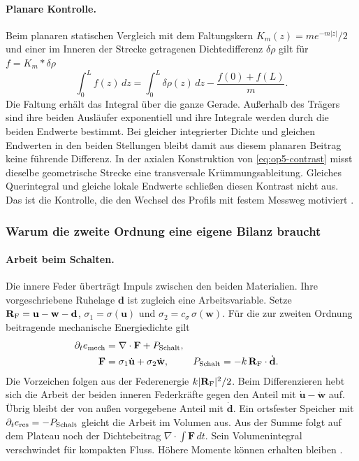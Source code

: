 \paragraph{Planare Kontrolle.}
Beim planaren statischen Vergleich mit dem Faltungskern \(K_m(z)=m e^{-m|z|}/2\) und einer im Inneren der Strecke getragenen Dichtedifferenz \(\delta\rho\) gilt für \(f=K_m*\delta\rho\)
\begin{equation}
 \int_0^L f(z)\,dz
   =\int_0^L\delta\rho(z)\,dz-\frac{f(0)+f(L)}{m}.
 \label{eq:op5-planar-check}
\end{equation}
Die Faltung erhält das Integral über die ganze Gerade. Außerhalb des Trägers sind ihre beiden Ausläufer exponentiell und ihre Integrale werden durch die beiden Endwerte bestimmt. Bei gleicher integrierter Dichte und gleichen Endwerten in den beiden Stellungen bleibt damit aus diesem planaren Beitrag keine führende Differenz. In der axialen Konstruktion von \eqref{eq:op5-contrast} misst dieselbe geometrische Strecke eine transversale Krümmungsableitung. Gleiches Querintegral und gleiche lokale Endwerte schließen diesen Kontrast nicht aus. Das ist die Kontrolle, die den Wechsel des Profils mit festem Messweg motiviert \cite{op5-axis}.

\subsubsection{Warum die zweite Ordnung eine eigene Bilanz braucht}

\paragraph{Arbeit beim Schalten.}
Die innere Feder überträgt Impuls zwischen den beiden Materialien. Ihre vorgeschriebene Ruhelage \(\mathbf d\) ist zugleich eine Arbeitsvariable. Setze \(\mathbf R_{\rm F}=\mathbf u-\mathbf w-\mathbf d\), \(\sigma_1=\sigma(\mathbf u)\) und \(\sigma_2=c_\sigma\,\sigma(\mathbf w)\). Für die zur zweiten Ordnung beitragende mechanische Energiedichte gilt
\begin{align}
 \partial_t e_{\rm mech}&=\nabla\cdot\mathbf F+P_{\rm Schalt},\\
 \mathbf F&=\sigma_1\dot{\mathbf u}+\sigma_2\dot{\mathbf w},
 &P_{\rm Schalt}&=-k\,\mathbf R_{\rm F}\cdot\dot{\mathbf d}.
 \label{eq:op5-drive-energy}
\end{align}
Die Vorzeichen folgen aus der Federenergie \(k|\mathbf R_{\rm F}|^2/2\). Beim Differenzieren hebt sich die Arbeit der beiden inneren Federkräfte gegen den Anteil mit \(\dot{\mathbf u}-\dot{\mathbf w}\) auf. Übrig bleibt der von außen vorgegebene Anteil mit \(\dot{\mathbf d}\). Ein ortsfester Speicher mit \(\partial_t e_{\rm res}=-P_{\rm Schalt}\) gleicht die Arbeit im Volumen aus. Aus der Summe folgt auf dem Plateau noch der Dichtebeitrag \(\nabla\cdot\int\mathbf F\,dt\). Sein Volumenintegral verschwindet für kompakten Fluss. Höhere Momente können erhalten bleiben \cite{op5-feder}.

